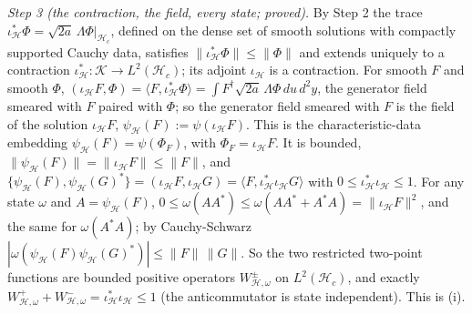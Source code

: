 \emph{Step 3 (the contraction, the field, every state; proved).} By Step 2 the trace $\iota_{\mathcal{H}}^{*}\Phi = \sqrt{2a}\,\Lambda\Phi|_{\mathcal{H}_{c}}$, defined on the dense set of smooth solutions with compactly supported Cauchy data, satisfies $\|\iota_{\mathcal{H}}^{*}\Phi\| \le \|\Phi\|$ and extends uniquely to a contraction $\iota_{\mathcal{H}}^{*}: \mathcal{K} \to L^{2}(\mathcal{H}_{c})$; its adjoint $\iota_{\mathcal{H}}$ is a contraction. For smooth $F$ and smooth $\Phi$, $(\iota_{\mathcal{H}}F, \Phi) = \langle F, \iota_{\mathcal{H}}^{*}\Phi\rangle = \int F^{\dagger}\sqrt{2a}\,\Lambda\Phi\,du\,d^{2}y$, the generator field smeared with $F$ paired with $\Phi$; so the generator field smeared with $F$ is the field of the solution $\iota_{\mathcal{H}}F$, $\psi_{\mathcal{H}}(F) := \psi(\iota_{\mathcal{H}}F)$. This is the characteristic-data embedding $\psi_{\mathcal{H}}(F) = \psi(\Phi_{F})$, with $\Phi_{F} = \iota_{\mathcal{H}}F$. It is bounded, $\|\psi_{\mathcal{H}}(F)\| = \|\iota_{\mathcal{H}}F\| \le \|F\|$, and $\{\psi_{\mathcal{H}}(F), \psi_{\mathcal{H}}(G)^{*}\} = (\iota_{\mathcal{H}}F, \iota_{\mathcal{H}}G) = \langle F, \iota_{\mathcal{H}}^{*}\iota_{\mathcal{H}}G\rangle$ with $0 \le \iota_{\mathcal{H}}^{*}\iota_{\mathcal{H}} \le 1$. For any state $\omega$ and $A = \psi_{\mathcal{H}}(F)$, $0 \le \omega(AA^{*}) \le \omega(AA^{*} + A^{*}A) = \|\iota_{\mathcal{H}}F\|^{2}$, and the same for $\omega(A^{*}A)$; by Cauchy-Schwarz $|\omega(\psi_{\mathcal{H}}(F)\psi_{\mathcal{H}}(G)^{*})| \le \|F\|\,\|G\|$. So the two restricted two-point functions are bounded positive operators $W^{\pm}_{\mathcal{H},\omega}$ on $L^{2}(\mathcal{H}_{c})$, and exactly $W^{+}_{\mathcal{H},\omega} + W^{-}_{\mathcal{H},\omega} = \iota_{\mathcal{H}}^{*}\iota_{\mathcal{H}} \le 1$ (the anticommutator is state independent). This is (i).

